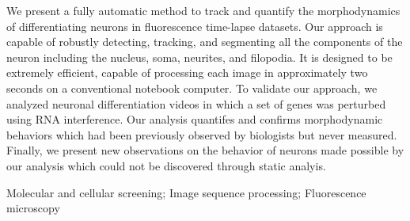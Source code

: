 
We  present  a  fully  automatic  method to  track  and  quantify  the
morphodynamics of  differentiating neurons in  fluorescence time-lapse
datasets.     Our  approach is capable of robustly detecting,
tracking, and segmenting all the  components of the neuron including 
the nucleus, soma, neurites, and filopodia.  It is designed to be extremely efficient, capable of processing
each image in approximately two seconds on a conventional notebook
computer.  To validate our approach, we  analyzed  neuronal
differentiation videos in  which a set of genes  was perturbed using
RNA interference. Our analysis quantifes and confirms morphodynamic behaviors 
which had been previously observed by biologists but never measured.
Finally, we present new observations on the behavior of neurons made
possible by our analysis which could not be discovered through static analyis.


\begin{keywords}
Molecular and cellular screening; Image sequence processing; Fluorescence microscopy
\end{keywords}











